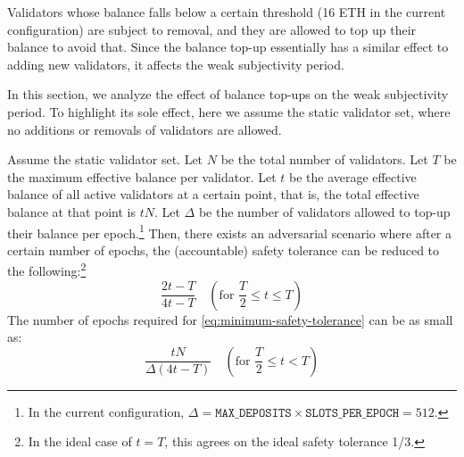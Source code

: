 Validators whose balance falls below a certain threshold (16 ETH in the current configuration) are subject to removal, and they are allowed to top up their balance to avoid that.  Since the balance top-up essentially has a similar effect to adding new validators, it affects the weak subjectivity period.

In this section, we analyze the effect of balance top-ups on the weak subjectivity period.
To highlight its sole effect, here we assume the static validator set, where no additions or removals of validators are allowed.

\begin{lemma}\label{lem:potential-safety-tolerance}
Assume the static validator set.
Let $N$ be the total number of validators.
Let $T$ be the maximum effective balance per validator.
Let $t$ be the average effective balance of all active validators at a certain point, that is, the total effective balance at that point is $tN$.
Let $\Delta$ be the number of validators allowed to top-up their balance per epoch.\footnote{In the current configuration, $\Delta = \texttt{MAX\_DEPOSITS} \times \texttt{SLOTS\_PER\_EPOCH} = 512$.}
%
Then, there exists an adversarial scenario where after a certain number of epochs, the (accountable) safety tolerance can be reduced to the following:\footnote{In the ideal case of $t = T$, this agrees on the ideal safety tolerance 1/3.}
\begin{equation}\label{eq:minimum-safety-tolerance}
\frac{2t - T}{4t - T} \quad (\text{for } \frac{T}{2} \le t \le T)
\end{equation}
The number of epochs required for \eqref{eq:minimum-safety-tolerance} can be as small as:
\begin{equation}\label{eq:min-epochs}
\frac{tN}{\Delta (4t - T)} \quad (\text{for } \frac{T}{2} \le t < T)
\end{equation}
%
\end{lemma}
